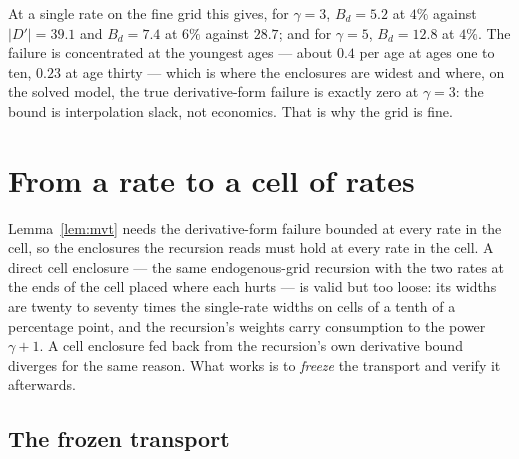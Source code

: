 \documentclass[11pt]{article}
\theoremstyle{definition}
\theoremstyle{remark}
\begin{document}
At a single rate on the fine grid this gives, for $\gamma=3$, $B_d=5.2$ at $4\%$ against
$|D'|=39.1$ and $B_d=7.4$ at $6\%$ against $28.7$; and for $\gamma=5$, $B_d=12.8$ at $4\%$. The
failure is concentrated at the youngest ages --- about $0.4$ per age at ages one to ten, $0.23$ at
age thirty --- which is where the enclosures are widest and where, on the solved model, the true
derivative-form failure is exactly zero at $\gamma=3$: the bound is interpolation slack, not
economics. That is why the grid is fine.

\section{From a rate to a cell of rates}\label{sec:cell}

Lemma~\ref{lem:mvt} needs the derivative-form failure bounded at every rate in the cell, so the
enclosures the recursion reads must hold at every rate in the cell. A direct cell enclosure --- the
same endogenous-grid recursion with the two rates at the ends of the cell placed where each hurts
--- is valid but too loose: its widths are twenty to seventy times the single-rate widths on cells
of a tenth of a percentage point, and the recursion's weights carry consumption to the power
$\gamma+1$. A cell enclosure fed back from the recursion's own derivative bound diverges for the
same reason. What works is to \emph{freeze} the transport and verify it afterwards.

\subsection{The frozen transport}
\end{document}
